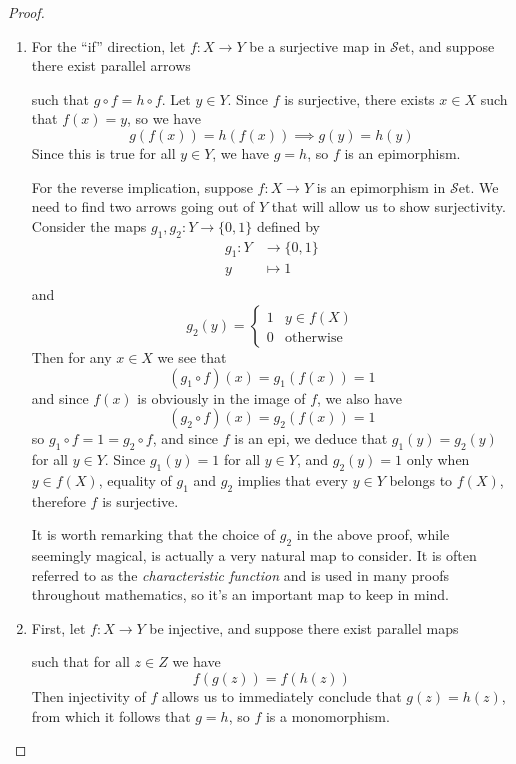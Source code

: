 \documentclass[10pt,oneside]{book}
\def\~#1{\mathscr{#1}}
\newcommand{\Set}{\~S\mathrm{et}}
\theoremstyle{plain}
\theoremstyle{definition}
\theoremstyle{remark}
\numberwithin{equation}{section}
\numberwithin{figure}{section}
\begin{document}
\begin{proof}
\hfill
\begin{enumerate}[label=(\roman*)]
    \item For the ``if'' direction, let $f: X \to Y$ be a surjective map in $\Set$, and suppose there exist parallel arrows  such that $g \circ f = h \circ f$. Let $y \in Y$. Since $f$ is surjective, there exists $x \in X$ such that $f(x) = y$, so we have
    \[g(f(x)) = h(f(x)) \implies g(y) = h(y)\]
    Since this is true for all $y \in Y$, we have $g = h$, so $f$ is an epimorphism. 

    For the reverse implication, suppose $f: X \to Y$ is an epimorphism in $\Set$. We need to find two arrows going out of $Y$ that will allow us to show surjectivity. Consider the maps $g_1, g_2: Y \to \{0, 1\}$ defined by
    \begin{align*}
        g_1: Y &\to \{0, 1\} \\
             y &\mapsto 1 \\
    \end{align*}
    and
    \[g_2(y) = \begin{cases}
                1 & y \in f(X) \\
                0 & \text{otherwise}
            \end{cases}\]
    Then for any $x \in X$ we see that 
    \[(g_1 \circ f)(x) = g_1(f(x)) = 1\]
    and since $f(x)$ is obviously in the image of $f$, we also have 
    \[(g_2 \circ f)(x) = g_2(f(x)) = 1\]
    so $g_1 \circ f = 1 = g_2 \circ f$, and since $f$ is an epi, we deduce that $g_1(y) = g_2(y)$ for all $y \in Y$. Since $g_1(y) = 1$ for all $y \in Y$, and $g_2(y) = 1$ only when $y \in f(X)$, equality of $g_1$ and $g_2$ implies that every $y \in Y$ belongs to $f(X)$, therefore $f$ is surjective.

    It is worth remarking that the choice of $g_2$ in the above proof, while seemingly magical, is actually a very natural map to consider. It is often referred to as the \emph{characteristic function} and is used in many proofs throughout mathematics, so it's an important map to keep in mind.

    \item First, let $f: X \to Y$ be injective, and suppose there exist parallel maps  such that for all $z \in Z$ we have
    \[f(g(z)) = f(h(z))\]
    Then injectivity of $f$ allows us to immediately conclude that $g(z) = h(z)$, from which it follows that $g = h$, so $f$ is a monomorphism.


\end{enumerate}
\end{proof}
\end{document}
